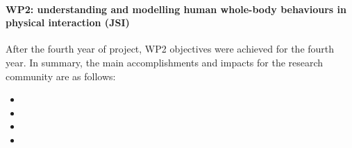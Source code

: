 

 
\paragraph*{WP2: understanding and modelling human whole-body behaviours in physical interaction (JSI)}

After the fourth year of project, WP2 objectives were achieved for the fourth year. In summary, the main accomplishments and impacts for the research community are as follows: 


\begin{itemize}

\item 
\item 
\item 
\item 

 \end{itemize}
